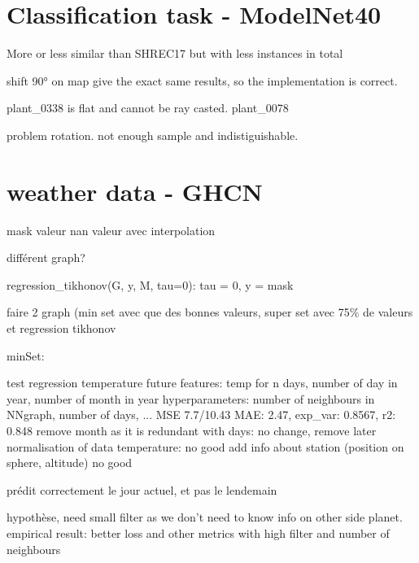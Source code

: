 \documentclass[11pt]{report}
\begin{document}
\section{Classification task - ModelNet40}
More or less similar than SHREC17 but with less instances in total

shift 90° on map give the exact same results, so the implementation is correct.

plant\_0338 is flat and cannot be ray casted.
plant\_0078

problem rotation. not enough sample and indistiguishable.
\section{weather data - GHCN}
mask valeur nan
valeur avec interpolation

différent graph?

regression\_tikhonov(G, y, M, tau=0): tau = 0, y = mask

faire 2 graph (min set avec que des bonnes valeurs, super set avec 75\% de valeurs et regression tikhonov

minSet:

test regression temperature future
features: temp for n days, number of day in year, number of month in year
hyperparameters: number of neighbours in NNgraph, number of days, ...
MSE 7.7/10.43 MAE: 2.47, exp\_var: 0.8567, r2: 0.848
remove month as it is redundant with days:
no change, remove later
normalisation of data temperature:
no good
add info about station (position on sphere, altitude)
no good

prédit correctement le jour actuel, et pas le lendemain

hypothèse, need small filter as we don't need to know info on other side planet.
empirical result: better loss and other metrics with high filter and number of neighbours
\end{document}
